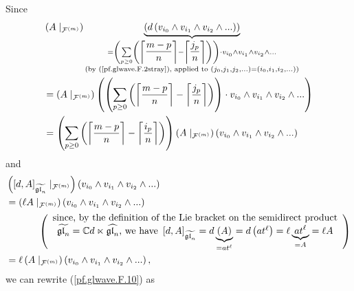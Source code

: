 \documentclass[etingof-lie.tex]{subfiles}
\begin{document}
Since%
\begin{align*}
&  \left(  A\mid_{\mathcal{F}^{\left(  m\right)  }}\right)
\underbrace{\left(  d\left(  v_{i_{0}}\wedge v_{i_{1}}\wedge v_{i_{2}}%
\wedge...\right)  \right)  }_{\substack{=\left(  \sum\limits_{p\geq0}\left(
\left\lceil \dfrac{m-p}{n}\right\rceil -\left\lceil \dfrac{j_{p}}%
{n}\right\rceil \right)  \right)  \cdot v_{i_{0}}\wedge v_{i_{1}}\wedge
v_{i_{2}}\wedge...\\\text{(by (\ref{pf.glwave.F.2stray}), applied to }\left(
j_{0},j_{1},j_{2},...\right)  =\left(  i_{0},i_{1},i_{2},...\right)  \text{)}%
}}\\
&  =\left(  A\mid_{\mathcal{F}^{\left(  m\right)  }}\right)  \left(  \left(
\sum\limits_{p\geq0}\left(  \left\lceil \dfrac{m-p}{n}\right\rceil
-\left\lceil \dfrac{j_{p}}{n}\right\rceil \right)  \right)  \cdot v_{i_{0}%
}\wedge v_{i_{1}}\wedge v_{i_{2}}\wedge...\right) \\
&  =\left(  \sum\limits_{p\geq0}\left(  \left\lceil \dfrac{m-p}{n}\right\rceil
-\left\lceil \dfrac{i_{p}}{n}\right\rceil \right)  \right)  \left(
A\mid_{\mathcal{F}^{\left(  m\right)  }}\right)  \left(  v_{i_{0}}\wedge
v_{i_{1}}\wedge v_{i_{2}}\wedge...\right)
\end{align*}
and%
\begin{align*}
&  \left(  \left[  d,A\right]  _{\widetilde{\mathfrak{gl}_{n}}}\mid
_{\mathcal{F}^{\left(  m\right)  }}\right)  \left(  v_{i_{0}}\wedge v_{i_{1}%
}\wedge v_{i_{2}}\wedge...\right) \\
&  =\left(  \ell A\mid_{\mathcal{F}^{\left(  m\right)  }}\right)  \left(
v_{i_{0}}\wedge v_{i_{1}}\wedge v_{i_{2}}\wedge...\right) \\
&  \ \ \ \ \ \ \ \ \ \ \left(
\begin{array}
[c]{c}%
\text{since, by the definition of the Lie bracket on the semidirect product}\\
\widetilde{\mathfrak{gl}_{n}}=\mathbb{C}d\ltimes\widehat{\mathfrak{gl}_{n}%
}\text{, we have }\left[  d,A\right]  _{\widetilde{\mathfrak{gl}_{n}}%
}=d\underbrace{\left(  A\right)  }_{=at^{\ell}}=d\left(  at^{\ell}\right)
=\ell\underbrace{at^{\ell}}_{=A}=\ell A
\end{array}
\right) \\
&  =\ell\left(  A\mid_{\mathcal{F}^{\left(  m\right)  }}\right)  \left(
v_{i_{0}}\wedge v_{i_{1}}\wedge v_{i_{2}}\wedge...\right)  ,
\end{align*}
we can rewrite (\ref{pf.glwave.F.10}) as%
\end{document}

